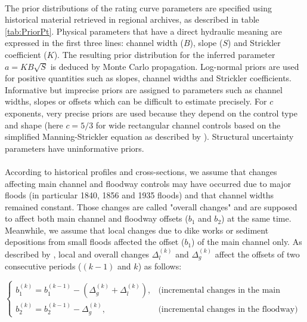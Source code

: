 \documentclass[11pt]{article}
\begin{document}
    \paragraph{}
    The prior distributions of the rating curve parameters are specified using historical material retrieved in regional archives, as described in table \ref{tab:PriorPt}. Physical parameters that have a direct hydraulic meaning are expressed in the first three lines: channel width ($B$), slope ($S$) and Strickler coefficient ($K$). The resulting prior distribution for the inferred parameter $a=KB\sqrt S$ is deduced by Monte Carlo propagation. Log-normal priors are used for positive quantities such as slopes, channel widths and Strickler coefficients. Informative but imprecise priors are assigned to parameters such as channel widths, slopes or offsets which can be difficult to estimate precisely. For $c$ exponents, very precise priors are used because they depend on the control type and shape (here $c=5/3$ for wide rectangular channel controls based on the simplified Manning-Strickler equation as described by \citet{le_coz_combining_2014}). Structural uncertainty parameters have uninformative priors.
    \paragraph{}
    According to historical profiles and cross-sections, we assume that changes affecting main channel and floodway controls may have occurred due to major floods (in particular 1840, 1856 and 1935 floods) and that channel widths remained constant. Those changes are called "overall changes" and are supposed to affect both main channel and floodway offsets ($b_1$ and $b_2$) at the same time.
    Meanwhile, we assume that local changes due to dike works or sediment depositions from small floods affected the offset ($b_1$) of the main channel only. As described by \citet{mansanarez_shift_2019}, local and overall changes $\Delta_l^{(k)}$ and $\Delta_g^{(k)}$ affect the offsets of two consecutive periods ($(k-1)$ and $k$) as follows: 
       
       \begin{equation}
          \begin{cases}
           b_1^{(k)} = b_1^{(k-1)}-(\Delta_g^{(k)}+\Delta_l^{(k)}), & \text{(incremental changes in the main channel)}\\
           b_2^{(k)} = b_2^{(k-1)}-\Delta_g^{(k)}, & \text{(incremental changes in the floodway)}
          \end{cases}
          \label{eq:SPD_Pt}
        \end{equation}
       
\end{document}
